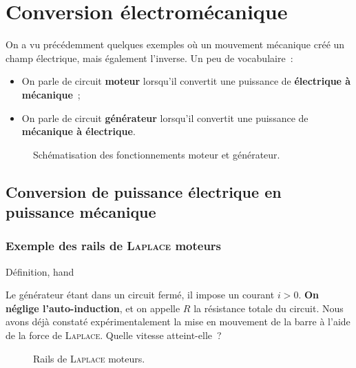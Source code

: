\documentclass[../main/main.tex]{subfiles}
\begin{document}
\setcounter{chapter}{3}
\chapter{Conversion électromécanique}
\label{ch:convelecmeca}

On a vu précédemment quelques exemples où un mouvement mécanique créé un champ
électrique, mais également l'inverse. Un peu de vocabulaire~:
\begin{itemize}[label=$\diamond$, leftmargin=10pt]
  \item On parle de circuit \textbf{moteur} lorsqu'il convertit une puissance
    de \textbf{électrique à mécanique}~;
  \item On parle de circuit \textbf{générateur} lorsqu'il convertit une puissance
    de \textbf{mécanique à électrique}.
\end{itemize}
\begin{figure}[h]
  \centering
  \caption{Schématisation des fonctionnements moteur et générateur.}
  \label{fig:motgene}
\end{figure}
\vspace*{-20pt}

\section{Conversion de puissance électrique en puissance mécanique}
\label{sec:convelecmeca}
\subsection{Exemple des rails de \textsc{Laplace} moteurs}
\label{ssec:rlplmot}
\begin{tdefi}{Définition, hand}
\end{tdefi}
Le générateur étant dans un circuit fermé, il impose un courant $i > 0$.
\textbf{On néglige l'auto-induction}, et on appelle $R$ la résistance totale du
circuit. Nous avons déjà constaté expérimentalement la mise en mouvement de la
barre à l'aide de la force de \textsc{Laplace}. Quelle vitesse atteint-elle~?
\begin{figure}[h]
  \centering
  \caption{Rails de \textsc{Laplace} moteurs.}
  \label{fig:rlplmot_schema}
\end{figure}
\vspace*{-20pt}
\end{document}
